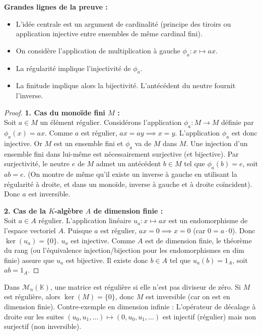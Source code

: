 \documentclass{prepacours}
\begin{document}
\noindent \textbf{Grandes lignes de la preuve :}
\begin{itemize}
    \item L'idée centrale est un argument de cardinalité (principe des tiroirs ou application injective entre ensembles de même cardinal fini).
    \item On considère l'application de multiplication à gauche $\phi_a : x \mapsto ax$.
    \item La régularité implique l'injectivité de $\phi_a$.
    \item La finitude implique alors la bijectivité. L'antécédent du neutre fournit l'inverse.
\end{itemize}

\restaurergeometrie

\begin{proof}
    \textbf{1. Cas du monoïde fini $M$ :} \\
    Soit $a \in M$ un élément régulier. Considérons l'application $\phi_a : M \to M$ définie par $\phi_a(x) = ax$.
    Comme $a$ est régulier, $ax = ay \implies x = y$. L'application $\phi_a$ est donc injective.
    Or $M$ est un ensemble fini et $\phi_a$ va de $M$ dans $M$. Une injection d'un ensemble fini dans lui-même est nécessairement surjective (et bijective).
    Par surjectivité, le neutre $e$ de $M$ admet un antécédent $b \in M$ tel que $\phi_a(b) = e$, soit $ab = e$.
    (On montre de même qu'il existe un inverse à gauche en utilisant la régularité à droite, et dans un monoïde, inverse à gauche et à droite coïncident). Donc $a$ est inversible.

    \vspace{0.5em}
    \textbf{2. Cas de la $K$-algèbre $A$ de dimension finie :} \\
    Soit $a \in A$ régulier. L'application linéaire $u_a : x \mapsto ax$ est un endomorphisme de l'espace vectoriel $A$.
    Puisque $a$ est régulier, $ax = 0 \implies x = 0$ (car $0 = a \cdot 0$). Donc $\ker(u_a) = \{0\}$.
    $u_a$ est injective. Comme $A$ est de dimension finie, le théorème du rang (ou l'équivalence injection/bijection pour les endomorphismes en dim finie) assure que $u_a$ est bijective.
    Il existe donc $b \in A$ tel que $u_a(b) = 1_A$, soit $ab = 1_A$.
\end{proof}

\begin{exemple}
    Dans $\mathcal{M}_n(\mathbb{K})$, une matrice est régulière si elle n'est pas diviseur de zéro. Si $M$ est régulière, alors $\ker(M) = \{0\}$, donc $M$ est inversible (car on est en dimension finie).
    Contre-exemple en dimension infinie : L'opérateur de décalage à droite sur les suites $(u_0, u_1, \dots) \mapsto (0, u_0, u_1, \dots)$ est injectif (régulier) mais non surjectif (non inversible).
\end{exemple}
\end{document}

